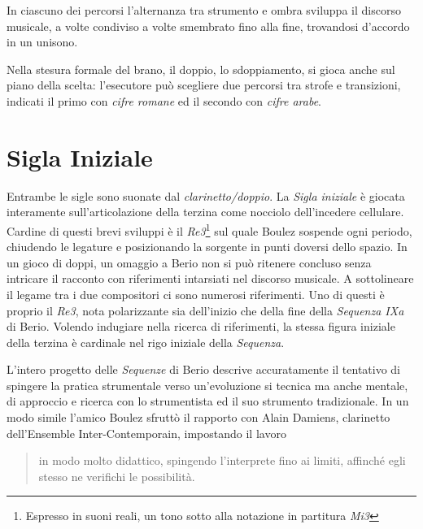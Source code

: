 
In ciascuno dei percorsi l'alternanza tra strumento e ombra sviluppa il discorso musicale, a volte condiviso a volte smembrato fino alla fine, trovandosi d'accordo in un unisono.

Nella stesura formale del brano, il doppio, lo sdoppiamento, si gioca anche sul piano della scelta: l'esecutore può scegliere due percorsi tra strofe e transizioni, indicati il primo con \emph{cifre romane} ed il secondo con \emph{cifre arabe}. %

\thispagestyle{fancy} %

\section*{Sigla Iniziale}

Entrambe le sigle sono suonate dal \emph{clarinetto/doppio}. La \emph{Sigla iniziale} è giocata interamente sull'articolazione della terzina come nocciolo dell'incedere cellulare. Cardine di questi brevi sviluppi è il \emph{Re3}\footnote{Espresso in suoni reali, un tono sotto alla notazione in partitura \emph{Mi3}} sul quale Boulez sospende ogni periodo, chiudendo le legature e posizionando la sorgente in punti doversi dello spazio. In un gioco di doppi, un omaggio a Berio non si può ritenere concluso senza intricare il racconto con riferimenti intarsiati nel discorso musicale. A sottolineare il legame tra i due compositori ci sono numerosi riferimenti. Uno di questi è proprio il \emph{Re3}, nota polarizzante sia dell'inizio che della fine della \emph{Sequenza IXa} di Berio.
Volendo indugiare nella ricerca di riferimenti, la stessa figura iniziale della terzina è cardinale nel rigo iniziale della \emph{Sequenza}.

L'intero progetto delle \emph{Sequenze} di Berio descrive accuratamente il tentativo di spingere la pratica strumentale verso un'evoluzione si tecnica ma anche mentale, di approccio e ricerca con lo strumentista ed il suo strumento tradizionale. In un modo simile l'amico Boulez sfruttò il rapporto con Alain Damiens, clarinetto dell'Ensemble Inter-Contemporain, impostando il lavoro

\begin{quote}
{\small
in modo molto didattico, spingendo l'interprete fino ai limiti, affinché egli stesso ne verifichi le possibilità.
}
\end{quote}

